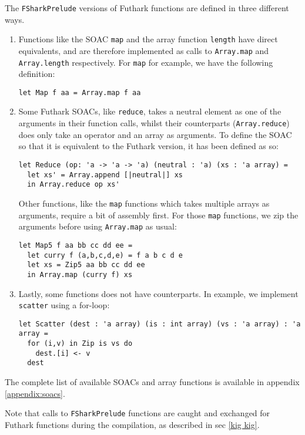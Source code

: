 The \texttt{FSharkPrelude} versions of Futhark functions are defined in three
different ways.
\begin{enumerate}
  \item Functions like the SOAC \texttt{map} and the array function
    \texttt{length} have direct \fsharp{} equivalents, and are therefore
    implemented as calls to \texttt{Array.map} and \texttt{Array.length}
    respectively.
    For \texttt{map} for example, we have the following definition:
    \begin{verbatim}
let Map f aa = Array.map f aa
    \end{verbatim}

  \item Some Futhark SOACs, like \texttt{reduce}, takes a neutral element as one of the
    arguments in their function calls, whilst their \fsharp{} counterparts
    (\texttt{Array.reduce}) does only take an operator and an array as
    arguments.
    To define the \fshark{} SOAC so that it is equivalent to the Futhark
    version, it has been defined as so:
\begin{verbatim}
let Reduce (op: 'a -> 'a -> 'a) (neutral : 'a) (xs : 'a array) =
  let xs' = Array.append [|neutral|] xs
  in Array.reduce op xs'
\end{verbatim}

    Other functions, like the \texttt{map} functions which takes multiple arrays as
    arguments, require a bit of assembly first. For those \texttt{map} functions,
    we zip the arguments before using \texttt{Array.map} as usual:
\begin{verbatim}
let Map5 f aa bb cc dd ee =
  let curry f (a,b,c,d,e) = f a b c d e
  let xs = Zip5 aa bb cc dd ee
  in Array.map (curry f) xs
\end{verbatim}

    \item Lastly, some functions does not have \fsharp{} counterparts. In
      example, we implement \texttt{scatter} using a for-loop:
\begin{verbatim}
let Scatter (dest : 'a array) (is : int array) (vs : 'a array) : 'a array =
  for (i,v) in Zip is vs do
    dest.[i] <- v
  dest
      \end{verbatim}
\end{enumerate}
The complete list of available SOACs and array functions is available in
appendix \ref{appendix:soacs}.

Note that calls to \texttt{FSharkPrelude} functions are caught and exchanged for
Futhark functions during the \fshark{} compilation, as described in sec \ref{kig
  kig}.

